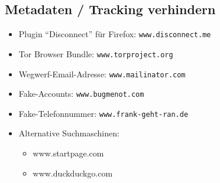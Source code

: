 \documentclass[a5paper]{scrartcl}
\begin{document}
\subsection*{Metadaten / Tracking verhindern}
\begin{itemize}
  \item Plugin ``Disconnect'' für Firefox: \texttt{www.disconnect.me}
  \item Tor Browser Bundle: \texttt{www.torproject.org}
  \item Wegwerf-Email-Adresse: \texttt{www.mailinator.com}
  \item Fake-Accounts: \texttt{www.bugmenot.com}
  \item Fake-Telefonnummer: \texttt{www.frank-geht-ran.de}
  \item Alternative Suchmaschinen: 
    \begin{itemize}
      \item www.startpage.com 
      \item www.duckduckgo.com
    \end{itemize}
\end{itemize}
\end{document}
